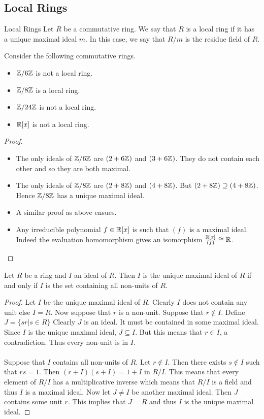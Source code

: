 \documentclass[a4paper]{article}
\begin{document}
\subsection{Local Rings}
\begin{defn}{Local Rings}{} Let $R$ be a commutative ring. We say that $R$ is a local ring if it has a unique maximal ideal $m$. In this case, we say that $R/m$ is the residue field of $R$. 
\end{defn}

\begin{eg}{}{} Consider the following commutative rings. 
\begin{itemize}
\item $\mathbb{Z}/6\mathbb{Z}$ is not a local ring. 
\item $\mathbb{Z}/8\mathbb{Z}$ is a local ring. 
\item $\mathbb{Z}/24\mathbb{Z}$ is not a local ring. 
\item $\mathbb{R}[x]$ is not a local ring. 
\end{itemize} \tcbline
\begin{proof}~\\
\begin{itemize}
\item The only ideals of $\mathbb{Z}/6\mathbb{Z}$ are $(2+6\mathbb{Z})$ and $(3+6\mathbb{Z})$. They do not contain each other and so they are both maximal. 
\item The only ideals of $\mathbb{Z}/8\mathbb{Z}$ are $(2+8\mathbb{Z})$ and $(4+8\mathbb{Z})$. But $(2+8\mathbb{Z})\supseteq(4+8\mathbb{Z})$. Hence $\mathbb{Z}/8\mathbb{Z}$ has a unique maximal ideal. 
\item A similar proof as above ensues. 
\item Any irreducible polynomial $f\in\mathbb{R}[x]$ is such that $(f)$ is a maximal ideal. Indeed the evaluation homomorphism gives an isomorphism $\frac{\mathbb{R}[x]}{(f)}\cong\mathbb{R}$. 
\end{itemize}
\end{proof}
\end{eg}

\begin{prp}{}{} Let $R$ be a ring and $I$ an ideal of $R$. Then $I$ is the unique maximal ideal of $R$ if and only if $I$ is the set containing all non-units of $R$. \tcbline
\begin{proof}
Let $I$ be the unique maximal ideal of $R$. Clearly $I$ does not contain any unit else $I=R$. Now suppose that $r$ is a non-unit. Suppose that $r\notin I$. Define $J=\{sr|s\in R\}$ Clearly $J$ is an ideal. It must be contained in some maximal ideal. Since $I$ is the unique maximal ideal, $J\subseteq I$. But this means that $r\in I$, a contradiction. Thus every non-unit is in $I$. \\~\\
Suppose that $I$ contains all non-units of $R$. Let $r\notin I$. Then there exists $s\notin I$ such that $rs=1$. Then $(r+I)(s+I)=1+I$ in $R/I$. This means that every element of $R/I$ has a multiplicative inverse which means that $R/I$ is a field and thus $I$ is a maximal ideal. Now let $J\neq I$ be another maximal ideal. Then $J$ contains some unit $r$. This implies that $J=R$ and thus $I$ is the unique maximal ideal. 
\end{proof}
\end{prp}
\end{document}
